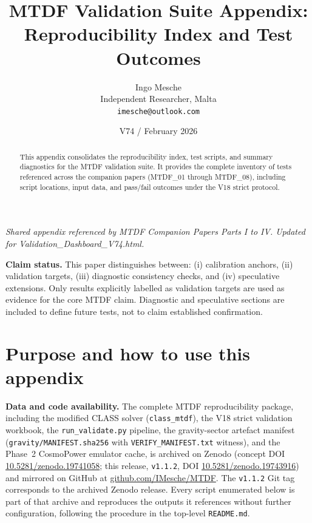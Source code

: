 \documentclass[11pt,a4paper]{article}
\title{MTDF Validation Suite Appendix: Reproducibility Index and Test Outcomes}
\author{Ingo Mesche\\ \small Independent Researcher, Malta \\ \small \texttt{imesche@outlook.com}}
\date{V74 / February 2026}
\begin{document}
\maketitle
\begin{center}\itshape Shared appendix referenced by MTDF Companion Papers Parts I to IV. Updated for Validation\_\allowbreak{}Dashboard\_\allowbreak{}V74.html.\end{center}

\begin{abstract}
This appendix consolidates the reproducibility index, test scripts, and summary diagnostics for the MTDF validation suite. It provides the complete inventory of tests referenced across the companion papers (MTDF\_\allowbreak{}01 through MTDF\_\allowbreak{}08), including script locations, input data, and pass/\allowbreak{}fail outcomes under the V18 strict protocol.
\end{abstract}

\begin{mdframed}[linecolor=accent,linewidth=0.5pt,backgroundcolor=callout-bg,leftline=true,rightline=true,topline=true,bottomline=true,innerleftmargin=8pt,innerrightmargin=8pt,innertopmargin=6pt,innerbottommargin=6pt]
\textbf{Claim status.}
This paper distinguishes between:
(i) calibration anchors,
(ii) validation targets,
(iii) diagnostic consistency checks, and
(iv) speculative extensions.
Only results explicitly labelled as validation targets are used as evidence for the core MTDF claim. Diagnostic and speculative sections are included to define future tests, not to claim established confirmation.
\end{mdframed}


\section{Purpose and how to use this appendix}

\textbf{Data and code availability.}
The complete MTDF reproducibility package, including the modified CLASS solver
(\texttt{class\_\allowbreak{}mtdf}), the V18 strict validation workbook, the
\texttt{run\_\allowbreak{}validate.py} pipeline, the gravity-sector artefact
manifest (\texttt{gravity/\allowbreak{}MANIFEST.sha256} with
\texttt{VERIFY\_\allowbreak{}MANIFEST.txt} witness), and the Phase~2 CosmoPower
emulator cache, is archived on Zenodo
(concept DOI \href{https://doi.org/10.5281/zenodo.19741058}{10.5281/\allowbreak{}zenodo.\allowbreak{}19741058};
this release, \texttt{v1.1.2}, DOI
\href{https://doi.org/10.5281/zenodo.19743916}{10.5281/\allowbreak{}zenodo.\allowbreak{}19743916})
and mirrored on GitHub at
\href{https://github.com/IMesche/MTDF}{github.com/\allowbreak{}IMesche/\allowbreak{}MTDF}.
The \texttt{v1.1.2} Git tag corresponds to the archived Zenodo release. Every
script enumerated below is part of that archive and reproduces the outputs it
references without further configuration, following the procedure in the
top-level \texttt{README.md}.
\end{document}
